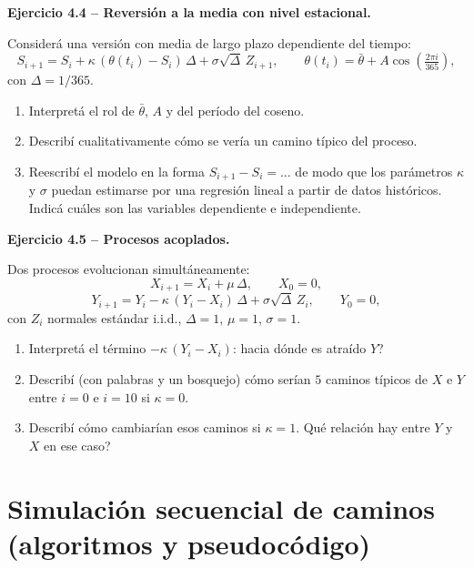 \documentclass[11pt,a4paper]{article}
\newcommand{\ejercicio}[1]{\par\medskip\noindent\textbf{#1}\par\nopagebreak\smallskip}
\begin{document}
\ejercicio{Ejercicio 4.4 -- Reversi\'on a la media con nivel estacional.}
Consider\'a una versi\'on con media de largo plazo dependiente del tiempo:
\[
S_{i+1}=S_i+\kappa\,(\theta(t_i)-S_i)\,\Delta+\sigma\sqrt{\Delta}\,Z_{i+1},
\qquad \theta(t_i)=\bar\theta + A\cos\!\left(\tfrac{2\pi i}{365}\right),
\]
con $\Delta=1/365$.
\begin{enumerate}[label=(\alph*)]
  \item Interpret\'a el rol de $\bar\theta$, $A$ y del per\'iodo del coseno.
  \item Describ\'i cualitativamente c\'omo se ver\'ia un camino t\'ipico del proceso.
  \item Reescrib\'i el modelo en la forma $S_{i+1}-S_i = \dots$ de modo que los
        par\'ametros $\kappa$ y $\sigma$ puedan estimarse por una regresi\'on lineal a
        partir de datos hist\'oricos. Indic\'a cu\'ales son las variables dependiente e
        independiente.
\end{enumerate}

\ejercicio{Ejercicio 4.5 -- Procesos acoplados.}
Dos procesos evolucionan simult\'aneamente:
\[
X_{i+1}=X_i+\mu\,\Delta,\qquad X_0=0,
\]
\[
Y_{i+1}=Y_i-\kappa\,(Y_i-X_i)\,\Delta+\sigma\sqrt{\Delta}\,Z_i,\qquad Y_0=0,
\]
con $Z_i$ normales est\'andar i.i.d., $\Delta=1$, $\mu=1$, $\sigma=1$.
\begin{enumerate}[label=(\alph*)]
  \item Interpret\'a el t\'ermino $-\kappa\,(Y_i-X_i)$: \textquestiondown{}hacia d\'onde es atra\'ido $Y$?
  \item Describ\'i (con palabras y un bosquejo) c\'omo ser\'ian $5$ caminos t\'ipicos de
        $X$ e $Y$ entre $i=0$ e $i=10$ si $\kappa=0$.
  \item Describ\'i c\'omo cambiar\'ian esos caminos si $\kappa=1$. \textquestiondown{}Qu\'e relaci\'on hay
        entre $Y$ y $X$ en ese caso?
\end{enumerate}

\section{Simulaci\'on secuencial de caminos (algoritmos y pseudoc\'odigo)}
\end{document}
